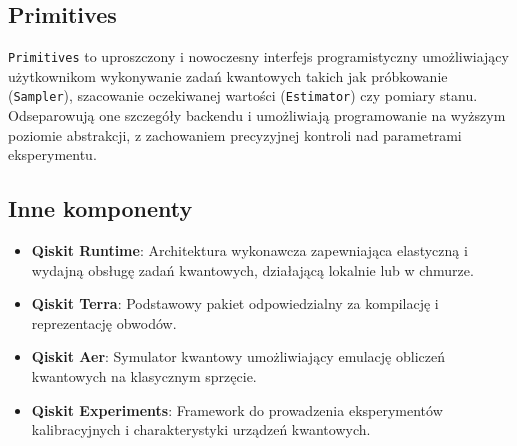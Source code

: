 \documentclass[a4paper,12pt]{article}
\begin{document}
\subsection{Primitives}
\texttt{Primitives} to uproszczony i nowoczesny interfejs programistyczny umożliwiający użytkownikom wykonywanie zadań kwantowych takich jak próbkowanie (\texttt{Sampler}), szacowanie oczekiwanej wartości (\texttt{Estimator}) czy pomiary stanu. Odseparowują one szczegóły backendu i umożliwiają programowanie na wyższym poziomie abstrakcji, z zachowaniem precyzyjnej kontroli nad parametrami eksperymentu.

\subsection{Inne komponenty}
\begin{itemize}
  \item \textbf{Qiskit Runtime}: Architektura wykonawcza zapewniająca elastyczną i wydajną obsługę zadań kwantowych, działającą lokalnie lub w chmurze.
  \item \textbf{Qiskit Terra}: Podstawowy pakiet odpowiedzialny za kompilację i reprezentację obwodów.
  \item \textbf{Qiskit Aer}: Symulator kwantowy umożliwiający emulację obliczeń kwantowych na klasycznym sprzęcie.
  \item \textbf{Qiskit Experiments}: Framework do prowadzenia eksperymentów kalibracyjnych i charakterystyki urządzeń kwantowych.
\end{itemize}
\end{document}
